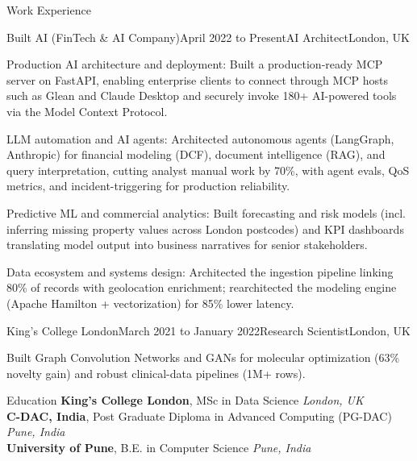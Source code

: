 \documentclass{resume} %
\begin{document}
\begin{rSection}{Work Experience}
\begin{rSubsection}{Built AI (FinTech \& AI Company)}{April 2022 to Present}{AI Architect}{London, UK}
\item Production AI architecture and deployment: Built a production-ready MCP server on FastAPI, enabling enterprise clients to connect through MCP hosts such as Glean and Claude Desktop and securely invoke 180+ AI-powered tools via the Model Context Protocol.
\item LLM automation and AI agents: Architected autonomous agents (LangGraph, Anthropic) for financial modeling (DCF), document intelligence (RAG), and query interpretation, cutting analyst manual work by 70\%, with agent evals, QoS metrics, and incident-triggering for production reliability.
\item Predictive ML and commercial analytics: Built forecasting and risk models (incl. inferring missing property values across London postcodes) and KPI dashboards translating model output into business narratives for senior stakeholders.
\item Data ecosystem and systems design: Architected the ingestion pipeline linking 80\% of records with geolocation enrichment; rearchitected the modeling engine (Apache Hamilton + vectorization) for 85\% lower latency.
\end{rSubsection}


\begin{rSubsection}{King's College London}{March 2021 to January 2022}{Research Scientist}{London, UK}
\item Built Graph Convolution Networks and GANs for molecular optimization (63\% novelty gain) and robust clinical-data pipelines (1M+ rows).

\end{rSubsection}

\end{rSection}



\begin{rSection}{Education}
{\bf King's College London}, MSc in Data Science \hfill {\em London, UK}\\
{\bf C-DAC, India}, Post Graduate Diploma in Advanced Computing (PG-DAC) \hfill {\em Pune, India}\\
{\bf University of Pune}, B.E. in Computer Science \hfill {\em Pune, India}
\end{rSection}

\end{document}
